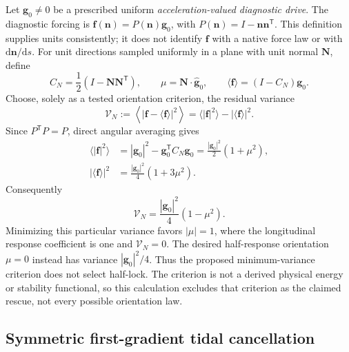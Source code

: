 \documentclass[11pt]{article}
\theoremstyle{plain}
\theoremstyle{remark}
\begin{document}
Let $\mathbf g_0\ne0$ be a prescribed uniform
\emph{acceleration-valued diagnostic drive}.  The diagnostic forcing is
$\mathbf f(\mathbf n)=P(\mathbf n)\mathbf g_0$, with
$P(\mathbf n)=I-\mathbf n\mathbf n^{\mathsf T}$.
This definition supplies units consistently; it does not identify
$\mathbf f$ with a native force law or with $\mathrm d\mathbf n/\mathrm ds$.
For unit directions sampled uniformly in a plane with unit normal
$\mathbf N$, define
\begin{equation}
 C_N=\frac12(I-\mathbf N\mathbf N^{\mathsf T}),\qquad
 \mu=\mathbf N\cdot\widehat{\mathbf g}_0,\qquad
 \langle\mathbf f\rangle=(I-C_N)\mathbf g_0 .
 \label{eq:diag-plane-drive}
\end{equation}
Choose, solely as a tested orientation criterion, the residual variance
\begin{equation}
 \mathcal V_N
 :=\left\langle|\mathbf f-\langle\mathbf f\rangle|^2\right\rangle
 =\langle|\mathbf f|^2\rangle-|\langle\mathbf f\rangle|^2 .
 \label{eq:diag-variance-definition}
\end{equation}
Since $P^{\mathsf T}P=P$, direct angular averaging gives
\begin{align}
 \langle|\mathbf f|^2\rangle
 &=|\mathbf g_0|^2-\mathbf g_0^{\mathsf T}C_N\mathbf g_0
   =\frac{|\mathbf g_0|^2}{2}(1+\mu^2),\\
 |\langle\mathbf f\rangle|^2
 &=\frac{|\mathbf g_0|^2}{4}(1+3\mu^2).
\end{align}
Consequently
\begin{equation}
 \boxed{\mathcal V_N=\frac{|\mathbf g_0|^2}{4}(1-\mu^2).}
 \label{eq:diag-variance-result}
\end{equation}
Minimizing this particular variance favors $|\mu|=1$, where the
longitudinal response coefficient is one and $\mathcal V_N=0$.
The desired half-response orientation $\mu=0$ instead has variance
$|\mathbf g_0|^2/4$.  Thus the proposed minimum-variance criterion
does not select half-lock.  The criterion is not a derived physical
energy or stability functional, so this calculation excludes that
criterion as the claimed rescue, not every possible orientation law.



\subsection{Symmetric first-gradient tidal cancellation}
\label{app:projection-tidal}
\end{document}
